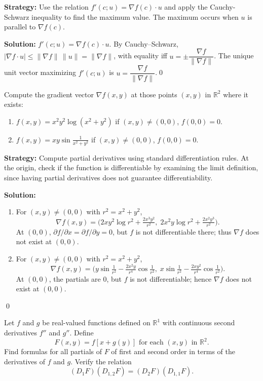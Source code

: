 \noindent\textbf{Strategy:} Use the relation \( f'(c; u) = \nabla f(c) \cdot u \) and apply the Cauchy-Schwarz inequality to find the maximum value. The maximum occurs when \( u \) is parallel to \( \nabla f(c) \).

\bigskip\noindent\textbf{Solution:}
$f'(c;u)=\nabla f(c)\cdot u$. By Cauchy–Schwarz, $|\nabla f\cdot u|\le\|\nabla f\|\,\|u\|=\|\nabla f\|$, with equality iff $u=\pm\dfrac{\nabla f}{\|\nabla f\|}$. The unique unit vector maximizing $f'(c;u)$ is $u=\dfrac{\nabla f}{\|\nabla f\|}$.\qed


\begin{problembox}
\begin{problemstatement}
Compute the gradient vector \( \nabla f(x, y) \) at those points \( (x, y) \) in \( \mathbb{R}^2 \) where it exists:
\begin{enumerate}[label=(\alph*)]
\item \( f(x, y) = x^2 y^2 \log (x^2 + y^2) \) if \( (x, y) \ne (0, 0) \), \( f(0, 0) = 0 \).
\item \( f(x, y) = xy \sin \frac{1}{x^2 + y^2} \) if \( (x, y) \ne (0, 0) \), \( f(0, 0) = 0 \).
\end{enumerate}
\end{problemstatement}
\end{problembox}

\noindent\textbf{Strategy:} Compute partial derivatives using standard differentiation rules. At the origin, check if the function is differentiable by examining the limit definition, since having partial derivatives does not guarantee differentiability.

\bigskip\noindent\textbf{Solution:}
\begin{enumerate}[label=(\alph*)]
\item For $(x,y)\ne(0,0)$ with $r^2=x^2+y^2$,
\[\nabla f(x,y)=\big(2xy^2\log r^2+\tfrac{2x^3y^2}{r^2},\;2x^2y\log r^2+\tfrac{2x^2y^3}{r^2}\big).\]
At $(0,0)$, $\partial f/\partial x=\partial f/\partial y=0$, but $f$ is not differentiable there; thus $\nabla f$ does not exist at $(0,0)$.
\item For $(x,y)\ne(0,0)$ with $r^2=x^2+y^2$,
\[\nabla f(x,y)=\big(y\sin\tfrac{1}{r^2}-\tfrac{2x^2y}{r^4}\cos\tfrac{1}{r^2},\;x\sin\tfrac{1}{r^2}-\tfrac{2xy^2}{r^4}\cos\tfrac{1}{r^2}\big).\]
At $(0,0)$, the partials are $0$, but $f$ is not differentiable; hence $\nabla f$ does not exist at $(0,0)$.
\end{enumerate}\qed


\begin{problembox}
\begin{problemstatement}
Let \( f \) and \( g \) be real-valued functions defined on \( \mathbb{R}^1 \) with continuous second derivatives \( f'' \) and \( g'' \). Define
\[F(x, y) = f[x + g(y)] \text{ for each } (x, y) \text{ in } \mathbb{R}^2.\]
Find formulas for all partials of \( F \) of first and second order in terms of the derivatives of \( f \) and \( g \). Verify the relation
\[(D_1F)(D_{1,2}F) = (D_2F)(D_{1,1}F).\]
\end{problemstatement}
\end{problembox}

